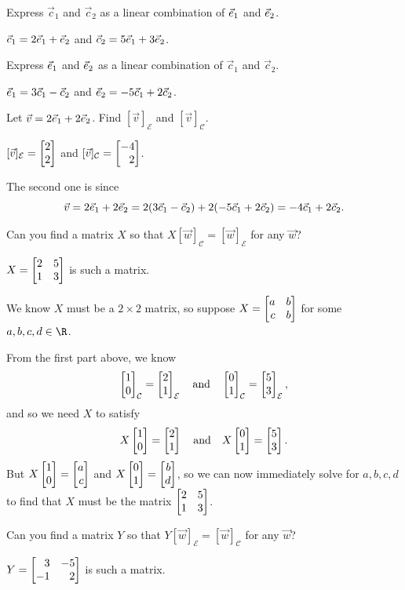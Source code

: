 \documentclass{problemset}
\begin{document}
	\begin{parts}
		\item Express $\vec c_1$ and $\vec c_2$ as a linear combination of ${\vec e_1}$ and ${\vec e_2}$.
			\begin{solution}[inline]
				$\vec c_1=2{\vec e_1}+{\vec e_2}$ and $\vec c_2=5{\vec e_1}+3{\vec e_2}$.
			\end{solution}
		\item Express ${\vec e_1}$ and ${\vec e_2}$ as a linear combination of $\vec c_1$ and $\vec c_2$.
			\begin{solution}[inline]
				${\vec e_1}=3\vec c_1-\vec c_2$ and ${\vec e_2}=-5\vec c_1+2\vec c_2$.
			\end{solution}
		\item Let $\vec v=2{\vec e_1}+2{\vec e_2}$. Find $[\vec v]_{\mathcal E}$ and $[\vec v]_{\mathcal C}$.
			\begin{solution}
				$[\vec v]_{\mathcal E} = \mat{2\\2}$ and
				$[\vec v]_{\mathcal C} = \mat{-4\\2}$.

				The second one is since
				\[
					\vec v=2{\vec e_1}+2{\vec e_2}
					=2(3\vec c_1-\vec c_2)+2(-5\vec c_1+2\vec c_2)
					=-4\vec c_1+2\vec c_2.
				\]
			\end{solution}
		\item Can you find a matrix $X$ so that $X[\vec w]_{\mathcal C} = [\vec w]_{\mathcal E}$
			for any	$\vec w$?
			\begin{solution}
				$X = \mat{2&5\\1&3}$ is such a matrix.

				We know $X$ must be a $2\times2$ matrix, so suppose $X=\mat{a&b\\c&b}$
				for some $a,b,c,d\in\R$.

				From the first part above, we know
				\[
					\mat{1\\0}_{\mathcal C} = \mat{2\\1}_{\mathcal E}
					\quad \text{and} \quad
					\mat{0\\1}_{\mathcal C} = \mat{5\\3}_{\mathcal E},
				\]
				and so we need $X$ to satisfy
				\[
					X\mat{1\\0}=\mat{2\\1}
					\quad \text{and} \quad
					X\mat{0\\1}=\mat{5\\3}.
				\]
				But $X\mat{1\\0}=\mat{a\\c}$ and $X\mat{0\\1}=\mat{b\\d}$, so we
				can now immediately solve for $a,b,c,d$ to find that $X$ must be
				the matrix $\mat{2&5\\1&3}$.
			\end{solution}
		\item Can you find a matrix $Y$ so that $Y[\vec w]_{\mathcal E} = [\vec w]_{\mathcal C}$
			for any	$\vec w$?
			\begin{solution}
				$Y = \mat{3&-5\\-1&2}$ is such a matrix.


\end{solution}
\end{parts}
\end{document}

